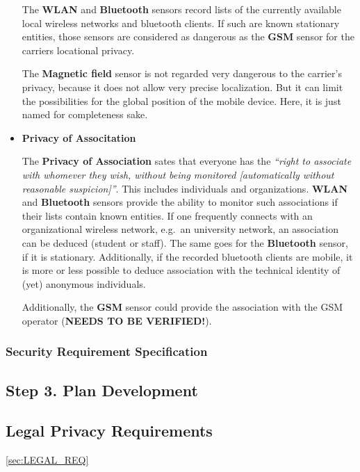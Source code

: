 \begin{itemize}
The \textbf{WLAN} and \textbf{Bluetooth} sensors record lists of the
currently available local wireless networks and bluetooth clients. If
such are known stationary entities, those sensors are considered as
dangerous as the \textbf{GSM} sensor for the carriers locational
privacy.

The \textbf{Magnetic field} sensor is not regarded very dangerous to the
carrier's privacy, because it does not allow very precise localization.
But it can limit the possibilities for the global position of the mobile
device. Here, it is just named for completeness sake.

\item
\textbf{Privacy of Associtation}

The \textbf{Privacy of Association} sates that everyone has the
\emph{``right to associate with whomever they wish, without being
monitored [automatically without reasonable suspicion]''}. This
includes individuals and organizations. \textbf{WLAN} and
\textbf{Bluetooth} sensors provide the ability to monitor such
associations if their lists contain known entities. If one frequently
connects with an organizational wireless network, e.g.~an university
network, an association can be deduced (student or staff). The same goes
for the \textbf{Bluetooth} sensor, if it is stationary. Additionally, if
the recorded bluetooth clients are mobile, it is more or less possible
to deduce association with the technical identity of (yet) anonymous
individuals.

Additionally, the \textbf{GSM} sensor could provide the association with
the GSM operator (\textbf{NEEDS TO BE VERIFIED!}).

\end{itemize}







\subsubsection{Security Requirement Specification}


\subsection{Step 3. Plan Development}

\subsection{Legal Privacy Requirements} \ref{sec:LEGAL_REQ}

